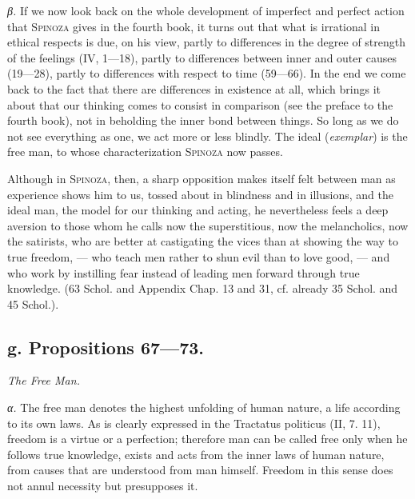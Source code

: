 \documentclass[12pt]{article}
\begin{document}
\textit{β.} If we now look back on the whole development of imperfect and perfect action that
\textsc{Spinoza} gives in the fourth book, it turns out that what is irrational in ethical respects
is due, on his view, partly to differences in the degree of strength of the feelings (IV, 1---18),
partly to differences between inner and outer causes (19---28), partly to differences with respect
to time (59---66). In the end we come back to the fact that there are differences in existence at
all, which brings it about that our thinking comes to consist in comparison (see the preface to the
fourth book), not in beholding the inner bond between things. So long as we do not see everything
as one, we act more or less blindly. The ideal (\textit{exemplar}) is the free man, to whose
characterization \textsc{Spinoza} now passes.

Although in \textsc{Spinoza}, then, a sharp opposition makes itself felt between man as experience
shows him to us, tossed about in blindness and in illusions, and the ideal man, the model for our
thinking and acting, he nevertheless feels a deep aversion to those whom he calls now the
superstitious, now the melancholics, now the satirists, who are better at castigating the vices
than at showing the way to true freedom, --- who teach men rather to shun evil than to love good,
--- and who work by instilling fear instead of leading men forward through true knowledge. (63
Schol. and Appendix Chap. 13 and 31, cf. already 35 Schol. and 45 Schol.).

\subsection*{g. Propositions 67---73.}
\begin{center}\textit{The Free Man.}\end{center}

\textit{α.} The free man denotes the highest unfolding of human nature, a life according to its own
laws. As is clearly expressed in the Tractatus politicus (II, 7. 11), freedom is a virtue or a
perfection; therefore man can be called free only when he follows true knowledge, exists and acts
from the inner laws of human nature, from causes that are understood from man himself. Freedom in
this sense does not annul necessity but presupposes it.
\end{document}
